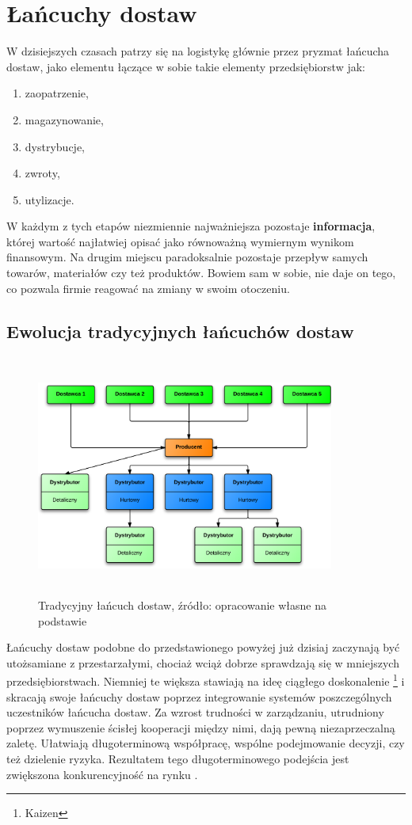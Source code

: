 \section{Łańcuchy dostaw}
\label{c2:supply_chains}
	W dzisiejszych czasach patrzy się na logistykę 
	głównie przez pryzmat łańcucha dostaw, jako
	elementu łączące w sobie takie elementy przedsiębiorstw jak:
	\begin{enumerate}
		\item zaopatrzenie,
		\item magazynowanie,
		\item dystrybucje,
		\item zwroty,
		\item utylizacje.
	\end{enumerate}
	W każdym z tych etapów niezmiennie najważniejsza 
	pozostaje \textbf{informacja}, której wartość najłatwiej
	opisać jako równoważną wymiernym wynikom finansowym. 
	Na drugim miejscu paradoksalnie pozostaje przepływ
	samych towarów, materiałów czy też produktów. 
	Bowiem sam w sobie, nie daje on tego, co pozwala
	firmie reagować na zmiany w swoim otoczeniu.
	\subsection{Ewolucja tradycyjnych łańcuchów dostaw}
		\begin{figure}[h]
			\centering
			\includegraphics[width=370px, height=300px]{images/BasicSupplyChain}
			\caption[Schemat budowy prostego łańcucha dostaw]{
				Tradycyjny łańcuch dostaw, źródło: opracowanie własne na podstawie \cite{zarzadzanie_lancuchem_dostaw_w_dobie_gospodarki_elektroniczej}
			}
		\end{figure}
		Łańcuchy dostaw podobne do przedstawionego powyżej już dzisiaj 
		zaczynają być utożsamiane z przestarzałymi, chociaż
		wciąż dobrze sprawdzają się w mniejszych przedsiębiorstwach. 
		Niemniej te większa stawiają na ideę ciągłego doskonalenie
		\footnote{Kaizen} i skracają swoje łańcuchy dostaw poprzez integrowanie 
		systemów poszczególnych uczestników łańcucha dostaw.
		Za wzrost trudności w zarządzaniu, utrudniony poprzez wymuszenie 
		ścisłej kooperacji między nimi, dają pewną niezaprzeczalną
		zaletę. Ułatwiają długoterminową współpracę, wspólne podejmowanie 
		decyzji, czy też dzielenie ryzyka. Rezultatem tego długoterminowego
		podejścia jest zwiększona konkurencyjność na rynku \cite{zarzadzanie_lancuchem_dostaw_w_dobie_gospodarki_elektroniczej}.\\
		
